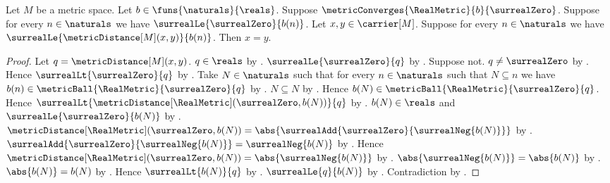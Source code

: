 \begin{theorem}\label{metric_distance_zero_from_convergent_bounds}
    Let $M$ be a metric space.
    Let $b\in\funs{\naturals}{\reals}$.
    Suppose $\metricConverges{\RealMetric}{b}{\surrealZero}$.
    Suppose for every $n\in\naturals$ we have
        $\surrealLe{\surrealZero}{b(n)}$.
    Let $x,y\in\carrier[M]$.
    Suppose for every $n\in\naturals$ we have
        $\surrealLe{\metricDistance[M](x,y)}{b(n)}$.
    Then $x=y$.
\end{theorem}
\begin{proof}
    Let $q=\metricDistance[M](x,y)$.
    $q\in\reals$ by .
    $\surrealLe{\surrealZero}{q}$
        by .
    Suppose not.
    $q\neq\surrealZero$ by .
    Hence $\surrealLt{\surrealZero}{q}$ by .
    Take $N\in\naturals$ such that for every $n\in\naturals$
        such that $N\subseteq n$ we have
            $b(n)\in\metricBall{\RealMetric}{\surrealZero}{q}$
        by .
    $N\subseteq N$ by .
    Hence $b(N)\in\metricBall{\RealMetric}{\surrealZero}{q}$.
    Hence
        $\surrealLt{
            \metricDistance[\RealMetric](\surrealZero,b(N))}{q}$
        by .
    $b(N)\in\reals$ and $\surrealLe{\surrealZero}{b(N)}$
        by .
    $\metricDistance[\RealMetric](\surrealZero,b(N))
        =\abs{\surrealAdd{\surrealZero}{\surrealNeg{b(N)}}}$
        by .
    $\surrealAdd{\surrealZero}{\surrealNeg{b(N)}}
        =\surrealNeg{b(N)}$
        by
        .
    Hence
        $\metricDistance[\RealMetric](\surrealZero,b(N))
            =\abs{\surrealNeg{b(N)}}$
        by \auto.
    $\abs{\surrealNeg{b(N)}}=\abs{b(N)}$
        by
        .
    $\abs{b(N)}=b(N)$
        by
        .
    Hence $\surrealLt{b(N)}{q}$ by \auto.
    $\surrealLe{q}{b(N)}$ by \auto.
    Contradiction by
        .
\end{proof}

